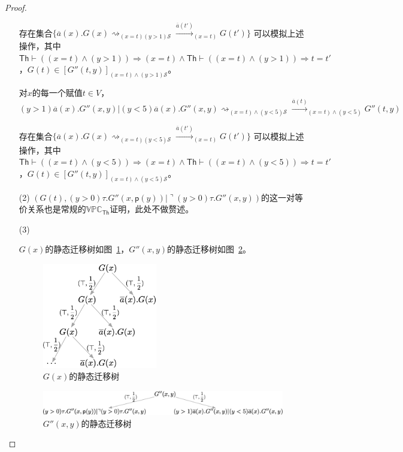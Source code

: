 \begin{proof}
\begin{itemize}
{\begin{itemize}
{               存在集合$\{\overline{a}(x).G(x)\rightsquigarrow_{(x=t)(y>1)\mathcal{S}}\stackrel{\overline{a}(t')}{\longrightarrow}_{(x=t)}G(t')\}$
               可以模拟上述操作，其中$\mathsf{Th}\vdash ((x=t)\wedge (y>1))\Rightarrow (x=t) \wedge \mathsf{Th}\vdash ((x=t)\wedge (y>1))\Rightarrow t=t'$，$G(t)\in [G''(t,y)]_{(x=t)\wedge (y>1)\mathcal{S}}$。
               
               对$x$的每一个赋值$t\in V$，
               $$(y>1)\overline{a}(x).G''(x,y)|(y<5)\overline{a}(x).G''(x,y)\rightsquigarrow_{(x=t)\wedge(y<5)\mathcal{S}}\stackrel{\overline{a}(t)}{\rightarrow}_{(x=t)\wedge(y<5)}G''(t,y)$$
               
               存在集合$\{\overline{a}(x).G(x)\rightsquigarrow_{(x=t)(y<5)\mathcal{S}}\stackrel{\overline{a}(t')}{\longrightarrow}_{(x=t)}G(t')\}$
               可以模拟上述操作，其中$\mathsf{Th}\vdash ((x=t)\wedge (y<5))\Rightarrow (x=t) \wedge\mathsf{Th}\vdash ((x=t)\wedge (y<5))\Rightarrow t=t'$，$G(t)\in [G''(t,y)]_{(x=t)\wedge (y<5)\mathcal{S}}$。
            }
         \end{itemize}
      }
      \item[(2)] {
         $(G(t),(y>0)\tau.G''(x,\mathsf{p}(y))|\urcorner (y>0)\tau.G''(x,y))$的这一对等价关系也是常规的$\mathbb{VPC}_{\mathsf{Th}}$证明，此处不做赘述。
      }
      \item[(3)] {
         $G(x)$的静态迁移树如图~\ref{fig_eg4_1}，$G''(x,y)$的静态迁移树如图~\ref{fig_eg4_2}。
         \begin{figure}[!htbp]
            \small
            \centering
            \includegraphics[width=5cm]{../figures/example1.png}
            \caption[]{$G(x)$的静态迁移树} 
            \label{fig_eg4_1}
         \end{figure}
         \begin{figure}[!htbp]
            \small
            \centering
            \includegraphics[width=13cm]{../figures/example4_2.png}
            \caption[]{$G''(x,y)$的静态迁移树} 
            \label{fig_eg4_2}
         \end{figure}

}
\end{itemize}
\end{proof}
